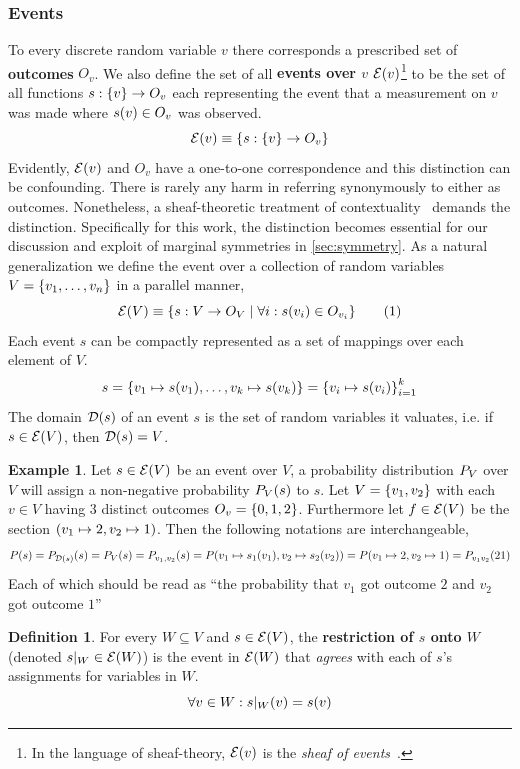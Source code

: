 \documentclass[aps, 10pt, english, twoside, pra, nofootinbib, longbibliography]{revtex4-1}
\theoremstyle{plain}
\theoremstyle{definition}
\newtheorem{definition}[theorem]{Definition}
\newtheorem{example}[theorem]{Example}
\theoremstyle{remark}
\newcommand{\term}[1]{\textcolor{Mahogany}{\textbf{#1}}}
\newcommand{\Events}[1]{\s{E}\br{#1}} %
\newcommand{\Dom}[1]{\s{D}\br{#1}} %
\begin{document}
    \subsubsection{Events}
    To every discrete random variable $v$ there corresponds a prescribed set of \term{outcomes} $O_v$. We also define the set of all \term{events over $v$} $\Events{v}$\footnote{In the language of sheaf-theory, $\Events{v}$ is the \textit{sheaf of events}~\cite{Abramsky_2011}.} to be the set of all functions $s : \bc{v} \to O_v$ each representing the event that a measurement on $v$ was made where $s\br{v} \in O_v$ was observed.
    \[ \Events{v} \defined \bc{s : \bc{v} \to O_v} \label{eq:outcome_space} \]
    Evidently, $\Events{v}$ and $O_v$ have a one-to-one correspondence and this distinction can be confounding. There is rarely any harm in referring synonymously to either as outcomes. Nonetheless, a sheaf-theoretic treatment of contextuality~\cite{Abramsky_2011} demands the distinction.
    Specifically for this work, the distinction becomes essential for our discussion and exploit of marginal symmetries in \cref{sec:symmetry}. As a natural generalization we define the event over a collection of random variables $V = \bc{v_1, \ldots, v_n}$ in a parallel manner,
    \[ \Events{V} \defined \bc{s: V \to O_{V} \mid \forall i : s\br{v_i} \in O_{v_i} } \eq \label{eq:outcome_space}\]
    Each event $s$ can be compactly represented as a set of mappings over each element of $V$.
    \[ s = \bc{v_1 \mapsto s\br{v_1}, \ldots, v_k \mapsto s\br{v_k}} = \bc{v_i\mapsto s\br{v_i}}_{i = 1}^{k} \]
    The domain $\Dom{s}$ of an event $s$ is the set of random variables it valuates, i.e. if $s \in \Events{V}$, then $\Dom{s} = V$.
    \begin{example}
        Let $s \in \Events{V}$ be an event over $V$, a probability distribution $\prob[V]$ over $V$ will assign a non-negative probability $\prob[V][s]$ to $s$. Let $V = \bc{v_1, v_2}$ with each $v \in V$ having $3$ distinct outcomes $O_v = \bc{0,1,2}$. Furthermore let $f \in \Events{V}$ be the section $\br{v_1 \mapsto 2, v_2 \mapsto 1}$. Then the following notations are interchangeable,
        \[ \prob[][s] = \prob[\Dom{s}][s] = \prob[V][s] = \prob[v_1, v_2][s] = \prob[][v_1 \mapsto s_1\br{v_1}, v_2 \mapsto s_2\br{v_2}] = \prob[][v_1 \mapsto 2, v_2 \mapsto 1] = \prob[v_1v_2][21] \]
        Each of which should be read as ``the probability that $v_1$ got outcome $2$ and $v_2$ got outcome $1$''
    \end{example}
    \begin{definition}
    \label{def:section_restriction}
    For every $W \subseteq V$ and $s \in \Events{V}$, the \term{restriction of $s$ onto $W$} (denoted $s|_{W} \in \Events{W}$) is the event in $\Events{W}$ that \textit{agrees} with each of $s$'s assignments for variables in $W$.
    \[ \forall v \in W : s|_{W}\br{v} = s\br{v} \]
    \end{definition}
\end{document}
